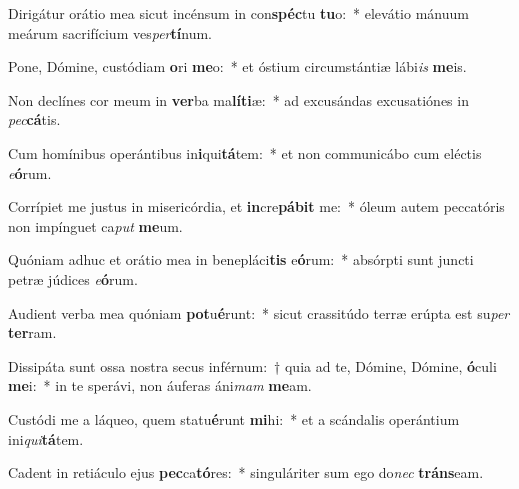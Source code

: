 \item Dirigátur orátio mea sicut incénsum in con\textbf{spéc}tu \textbf{tu}o:~* elevátio mánuum meárum sacrifícium ves\textit{per}\textbf{tí}num.
\item Pone, Dómine, custódiam \textbf{o}ri \textbf{me}o:~* et óstium circumstántiæ lábi\textit{is} \textbf{me}is.
\item Non declínes cor meum in \textbf{ver}ba ma\textbf{lí}\textbf{ti}æ:~* ad excusándas excusatiónes in \textit{pec}\textbf{cá}tis.
\item Cum homínibus operántibus in\textbf{i}qui\textbf{tá}tem:~* et non communicábo cum eléctis \textit{e}\textbf{ó}rum.
\item Corrípiet me justus in misericórdia, et \textbf{in}cre\textbf{pá}\textbf{bit} me:~* óleum autem peccatóris non impínguet ca\textit{put} \textbf{me}um.
\item Quóniam adhuc et orátio mea in benepláci\textbf{tis} e\textbf{ó}rum:~* absórpti sunt juncti petræ júdices \textit{e}\textbf{ó}rum.
\item Audient verba mea quóniam \textbf{pot}u\textbf{é}runt:~* sicut crassitúdo terræ erúpta est su\textit{per} \textbf{ter}ram.
\item Dissipáta sunt ossa nostra secus inférnum:~† quia ad te, Dómine, Dómine, \textbf{ó}culi \textbf{me}i:~* in te sperávi, non áuferas áni\textit{mam} \textbf{me}am.
\item Custódi me a láqueo, quem statu\textbf{é}runt \textbf{mi}hi:~* et a scándalis operántium ini\textit{qui}\textbf{tá}tem.
\item Cadent in retiáculo ejus \textbf{pec}ca\textbf{tó}res:~* singuláriter sum ego do\textit{nec} \textbf{tráns}eam.
